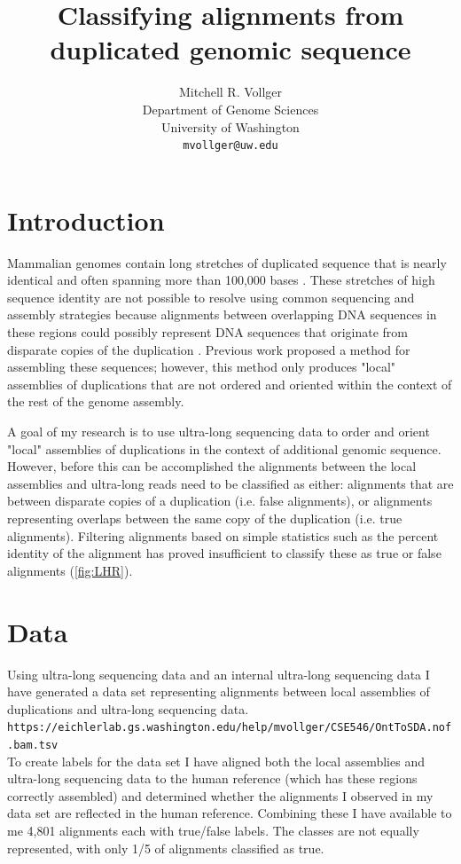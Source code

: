 \documentclass{article}
\title{\large{Classifying alignments from duplicated genomic sequence}}
\author{
  Mitchell R. Vollger
    \\
  Department of Genome Sciences\\
  University of Washington\\
  \texttt{mvollger@uw.edu} \\
}
\begin{document}

\maketitle

\section*{Introduction}

Mammalian genomes contain long stretches of duplicated sequence that is nearly identical and often spanning more than 100,000 bases \parencite{Lander2001, Waterston2002}. These stretches of high sequence identity are not possible to resolve using common sequencing and assembly strategies because alignments between overlapping DNA sequences in these regions could possibly represent DNA sequences that originate from disparate copies of the duplication \parencite{Pop2004, Chin2016, Gordon2016, Koren2017}. Previous work \parencite{Chaisson2017, Vollger2018} proposed a method for assembling these sequences; however, this method only produces "local" assemblies of duplications that are not ordered and oriented within the context of the rest of the genome assembly.

A goal of my research is to use ultra-long sequencing data \parencite{Jain2018} to order and orient "local" assemblies of duplications in the context of additional genomic sequence. However, before this can be accomplished the alignments between the local assemblies and ultra-long reads need to be classified as either: alignments that are between disparate copies of a duplication (i.e. false alignments), or alignments representing overlaps between the same copy of the duplication (i.e. true alignments). Filtering alignments based on simple statistics such as the percent identity of the alignment has proved insufficient to classify these as true or false alignments (\autoref{fig:LHR}). 

\section*{Data}
Using ultra-long sequencing data \parencite{Jain2018} and an internal ultra-long sequencing data I have generated a data set representing alignments between local assemblies of duplications and ultra-long sequencing data.\\
\texttt{https://eichlerlab.gs.washington.edu/help/mvollger/CSE546/OntToSDA.nof.bam.tsv} \\
To create labels for the data set I have aligned both the local assemblies and ultra-long sequencing data to the human reference (which has these regions correctly assembled) and determined whether the alignments I observed in my data set are reflected in the human reference. Combining these I have available to me 4,801 alignments each with true/false labels. The classes are not equally represented, with only 1/5 of alignments classified as true.   
\end{document}

